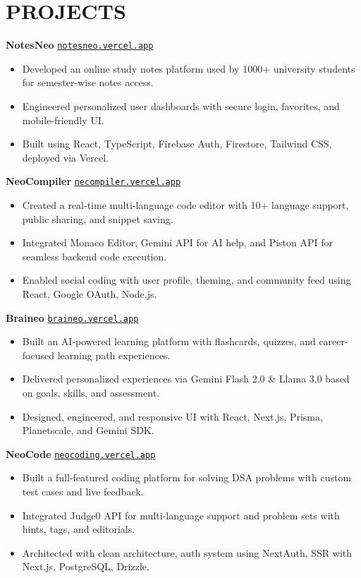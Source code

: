 \documentclass[a4paper,11pt]{article}
\begin{document}
\section*{PROJECTS}
\textbf{NotesNeo} \hfill \href{https://notesneo.vercel.app}{\texttt{notesneo.vercel.app}}
\begin{itemize}
    \item Developed an online study notes platform used by 1000+ university students for semester-wise notes access.
    \item Engineered personalized user dashboards with secure login, favorites, and mobile-friendly UI.
    \item Built using React, TypeScript, Firebase Auth, Firestore, Tailwind CSS, deployed via Vercel.
\end{itemize}

\vspace{6pt}

\textbf{NeoCompiler} \hfill \href{https://necompiler.vercel.app}{\texttt{necompiler.vercel.app}}
\begin{itemize}
    \item Created a real-time multi-language code editor with 10+ language support, public sharing, and snippet saving.
    \item Integrated Monaco Editor, Gemini API for AI help, and Piston API for seamless backend code execution.
    \item Enabled social coding with user profile, theming, and community feed using React, Google OAuth, Node.js.
\end{itemize}

\vspace{6pt}

\textbf{Braineo} \hfill \href{https://braineo.vercel.app}{\texttt{braineo.vercel.app}}
\begin{itemize}
    \item Built an AI-powered learning platform with flashcards, quizzes, and career-focused learning path experiences.
    \item Delivered personalized experiences via Gemini Flash 2.0 \& Llama 3.0 based on goals, skills, and assessment.
    \item Designed, engineered, and responsive UI with React, Next.js, Prisma, Planetscale, and Gemini SDK.
\end{itemize}

\vspace{6pt}

\textbf{NeoCode} \hfill \href{https://neocoding.vercel.app}{\texttt{neocoding.vercel.app}}
\begin{itemize}
    \item Built a full-featured coding platform for solving DSA problems with custom test cases and live feedback.
    \item Integrated Judge0 API for multi-language support and problem sets with hints, tags, and editorials.
    \item Architected with clean architecture, auth system using NextAuth, SSR with Next.js, PostgreSQL, Drizzle.
\end{itemize}
\end{document}
